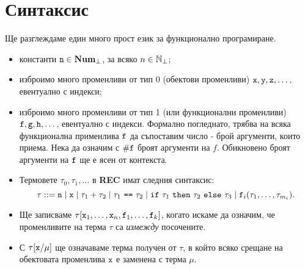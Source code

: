 \section{Синтаксис}
Ще разглеждаме един много прост език за функционално програмиране.
\begin{itemize}
\item
  константи $\texttt{n}\in\mathbf{Num}_\bot$, за всяко $n \in \mathbb{N}_\bot$;
\item
  изброимо много променливи от тип 0 (обектови променливи) $\texttt{x}, \texttt{y}, \texttt{z}, \dots$, евентуално с индекси;
\item
  изброимо много променливи от тип 1 (или функционални променливи) $\texttt{f},\texttt{g},\texttt{h},\dots$, евентуално с индекси. 
  Формално погледнато, трябва на всяка функционална применлива $\texttt{f}$
  да съпоставим число - брой аргументи, които приема. Нека да означим с $\#\texttt{f}$ броят аргументи на $f$.
  Обикновено броят аргументи на $\texttt{f}$ ще е ясен от контекста.
\item
  Термовете $\tau_0,\tau_1,\dots$ в {\bf REC} имат следния синтаксис:
  \[\tau ::= \texttt{n} \mid \texttt{x} \mid \tau_1 + \tau_2 \mid \tau_1\ \texttt{==}\ \tau_2 \mid \texttt{if}\ \tau_1\ \texttt{then}\ \tau_2\ \texttt{else}\ \tau_3 \mid \texttt{f}_i(\tau_1,\dots,\tau_{m_i}).\]
\item
  Ще записваме $\tau[\texttt{x}_1,\dots,\texttt{x}_n,\texttt{f}_1,\dots,\texttt{f}_k]$, когато искаме да означим, че променливите
  на терма $\tau$ са {\em измежду} посочените.
\item
  С $\tau[\texttt{x}/\mu]$ ще означаваме терма получен от $\tau$, в който всяко срещане на обектовата променлива $\texttt{x}$
  е заменена с терма $\mu$.
\end{itemize}


